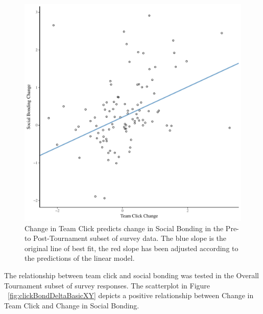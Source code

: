 \begin{CJK}{UTF8}{gbsn}
  \begin{figure}[htbp]
    \centering
  \includegraphics[scale=.5]{images/clickBondDeltaModelSlope.pdf}
    \caption{Change in Team Click predicts change in Social Bonding in the Pre- to Post-Tournament subset of survey data. The blue slope is the original line of best fit, the red slope has been adjusted according to the predictions of the linear model.}
    \label{fig:clickBondDeltaModelSlope}
  \end{figure}


   The relationship between team click and social bonding was tested in the Overall Tournament subset of survey responses. The scatterplot in Figure ~\ref{fig:clickBondDeltaBasicXY} depicts a positive relationship between Change in Team Click and Change in Social Bonding.


\end{CJK}
